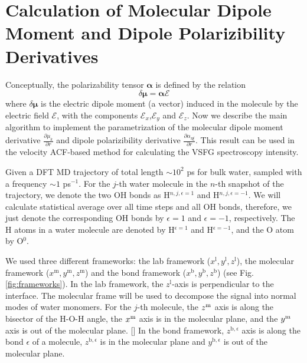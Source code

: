 \chapter{Calculation of Molecular Dipole Moment and Dipole Polarizibility Derivatives} \label{calculate_derivatives} 
Conceptually, the polarizability tensor $\boldsymbol{\alpha}$ is defined by the relation
\begin{equation}
  \delta \boldsymbol{\mu} = \boldsymbol{\alpha} \boldsymbol{\mathscr{E}}
  \label{eq:def_alpha}
\end{equation}
where $\delta \boldsymbol{\mu}$ is the electric dipole moment (a vector) induced in the molecule by
the electric field $\boldsymbol{\mathscr{E}}$, with the components $\mathscr{E}_x$,$\mathscr{E}_y$ and $\mathscr{E}_z$.
Now we describe the main algorithm to implement the parametrization of the molecular dipole moment 
derivative $\frac{\partial \mu_k}{\partial r}$ and dipole polarizibility derivative $\frac{\partial\alpha_{\eta\xi}}{\partial r}$. 
This result can be used in the velocity ACF-based method for calculating the VSFG spectroscopy intensity.

Given a DFT MD trajectory of total length $\sim 10^2$ ps for bulk water, sampled with a frequency $\sim 1$ ps$^{-1}$.
For the $j$-th water molecule in the $n$-th snapshot of the trajectory, 
we denote the two OH bonds as H$^{n,j,\epsilon=1}$ and H$^{n,j,\epsilon=-1}$. We will calculate statistical average over all time steps and all OH bonds, therefore, 
we just denote the corresponding OH bonds by ${\epsilon=1}$ and ${\epsilon=-1}$, respectively. 
The H atoms in a water molecule are denoted by H$^{\epsilon=1}$ and H$^{\epsilon=-1}$, and the O atom by O$^{0}$.

We used three different frameworks: the lab framework ($x^{\text{l}},y^{\text{l}},z^{\text{l}}$), the molecular framework
($x^{\text{m}},y^{\text{m}},z^{\text{m}}$) and the bond framework ($x^{\text{b}},y^{\text{b}},z^{\text{b}}$) (see Fig.\space\ref{fig:frameworks}).
In the lab framework, the $z^{\text{l}}$-axis is perpendicular to the interface.
The molecular frame will be used to decompose the signal into normal modes of water monomers.
For the $j$-th molecule, the $z^{\text m}$ axis is along the bisector of the H-O-H angle, the $x^{\text m}$ axis is in the molecular plane,
and the $y^{\text m}$ axis is out of the molecular plane. [\cite{Khatib2017}]
In the bond framework, $z^{\text{b},\epsilon}$ axis is along the bond $\epsilon$ of a molecule, $z^{\text{b},\epsilon}$
is in the molecular plane and $y^{\text{b},\epsilon}$ is out of the molecular plane.

